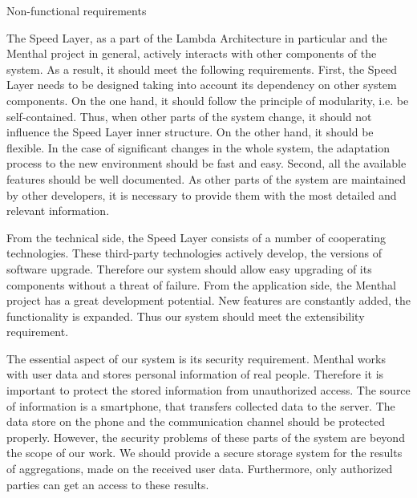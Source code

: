 Non-functional requirements

The Speed Layer, as a part of the Lambda Architecture in particular and the Menthal project in general, actively interacts with other components of the system.
As a result, it should meet the following requirements.
First, the Speed Layer needs to be designed taking into account its dependency on other system components.
On the one hand, it should follow the principle of modularity, i.e. be self-contained.
Thus, when other parts of the system change, it should not influence the Speed Layer inner structure.
On the other hand, it should be flexible.
In the case of significant changes in the whole system, the adaptation process to the new environment should be fast and easy.
Second, all the available features should be well documented.
As other parts of the system are maintained by other developers, it is necessary to provide them with the most detailed and relevant information.    

From the technical side, the Speed Layer consists of a number of cooperating technologies.
These third-party technologies actively develop, the versions of software upgrade.
Therefore our system should allow easy upgrading of its components without a threat of failure.
From the application side, the Menthal project has a great development potential.
New features are constantly added, the functionality is expanded.
Thus our system should meet the extensibility requirement.

The essential aspect of our system is its security requirement.
Menthal works with user data and stores personal information of real people.
Therefore it is important to protect the stored information from unauthorized access.
The source of information is a smartphone, that transfers collected data to the server.
The data store on the phone and the communication channel should be protected properly.
However, the security problems of these parts of the system are beyond the scope of our work.
We should provide a secure storage system for the results of aggregations, made on the received user data.
Furthermore, only authorized parties can get an access to these results.

